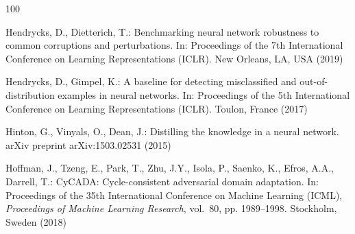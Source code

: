 \documentclass[graybox,envcountchap]{style/SNmono}
\begin{document}
\begin{thebibliography}{100}
{\par}
{\color{red} 
Hendrycks, D., Dietterich, T.: Benchmarking neural network robustness to common
  corruptions and perturbations.
\newblock In: Proceedings of the 7th International Conference on Learning
  Representations (ICLR). New Orleans, LA, USA (2019)

\par}
{\color{red} 
Hendrycks, D., Gimpel, K.: A baseline for detecting misclassified and
  out-of-distribution examples in neural networks.
\newblock In: Proceedings of the 5th International Conference on Learning
  Representations (ICLR). Toulon, France (2017)

\par}
{\color{red} 
Hinton, G., Vinyals, O., Dean, J.: Distilling the knowledge in a neural
  network.
\newblock arXiv preprint arXiv:1503.02531  (2015)

\par}
{\color{red} 
Hoffman, J., Tzeng, E., Park, T., Zhu, J.Y., Isola, P., Saenko, K., Efros,
  A.A., Darrell, T.: {CyCADA}: Cycle-consistent adversarial domain adaptation.
\newblock In: Proceedings of the 35th International Conference on Machine
  Learning (ICML), \emph{Proceedings of Machine Learning Research}, vol.~80,
  pp. 1989--1998. Stockholm, Sweden (2018)

}
\end{thebibliography}
\end{document}
